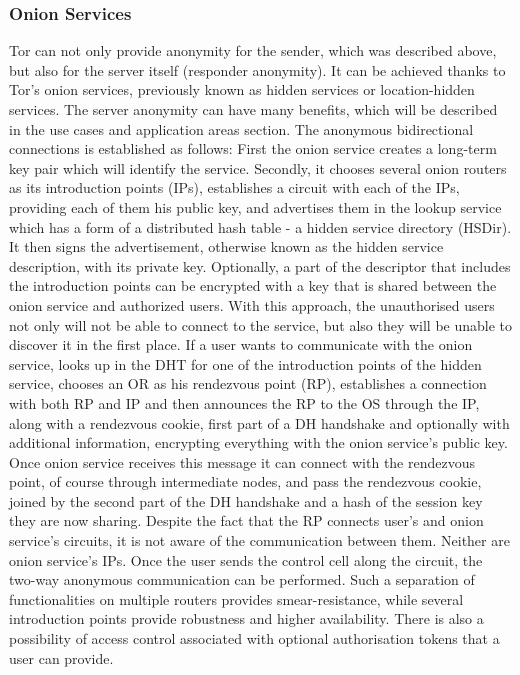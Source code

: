 \subsubsection{Onion Services}
Tor can not only provide anonymity for the sender, which was described above, but also for the server itself (responder anonymity). It can be achieved thanks to Tor’s onion services, previously known as hidden services or location-hidden services. The server anonymity can have many benefits, which will be described in the use cases and application areas section.
The anonymous bidirectional connections is established as follows:
First the onion service creates a long-term key pair which will identify the service. Secondly, it chooses several onion routers as its introduction points (IPs), establishes a circuit with each of the IPs, providing each of them his public key, and advertises them in the lookup service which has a form of a distributed hash table - a hidden service directory (HSDir). It then signs the advertisement, otherwise known as the hidden service description, with its private key. Optionally, a part of the descriptor that includes the introduction points can be encrypted with a key that is shared between the onion service and authorized users. With this approach, the unauthorised users not only will not be able to connect to the service, but also they will be unable to discover it in the first place.
If a user wants to communicate with the onion service, looks up in the DHT for one of the introduction points of the hidden service, chooses an OR as his rendezvous point (RP), establishes a connection with both RP and IP and then announces the RP to the OS through the IP, along with a rendezvous cookie, first part of a DH handshake and optionally with additional information, encrypting everything with the onion service’s public key. Once onion service receives this message it can connect with the rendezvous point, of course through intermediate nodes, and pass the rendezvous cookie, joined by the second part of the DH handshake and a hash of the session key they are now sharing. Despite the fact that the RP connects user’s and onion service’s circuits, it is not aware of the communication between them. Neither are onion service’s IPs. Once the user sends the control cell along the circuit, the two-way anonymous communication can be performed.
Such a separation of functionalities on multiple routers provides smear-resistance, while several introduction points provide robustness and higher availability.
There is also a possibility of access control associated with optional authorisation tokens that a user can provide.
